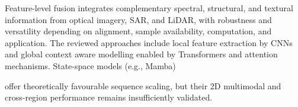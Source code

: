 \documentclass[]{interact}
\theoremstyle{plain}%
\theoremstyle{definition}
\theoremstyle{remark}
\DeclareRobustCommand{\DIFadd}[1]{{\protect\color{DIFaddcolor}\uwave{#1}}}
\DeclareRobustCommand{\DIFdel}[1]{{\protect\color{DIFdelcolor}\sout{#1}}}
\def\DIFadd#1{#1}%
\def\DIFdel#1{}%
\begin{document}
Feature-level fusion\DIFdel{,} \DIFdel{which} \DIFdel{leverages} \DIFdel{sophisticated} \DIFdel{neural} \DIFdel{architectures} \DIFdel{to} \DIFdel{integrate} \DIFdel{the} \DIFadd{integrates} complementary spectral, structural, and textural information from optical imagery, SAR, and LiDAR, \DIFdel{has} \DIFdel{established} \DIFdel{itself} \DIFdel{as} \DIFdel{the} \DIFdel{most} \DIFdel{robust} \DIFadd{with} \DIFadd{robustness} and \DIFdel{versatile} \DIFdel{strategy} \DIFadd{versatility} \DIFadd{depending} \DIFadd{on} \DIFadd{alignment}\DIFadd{,} \DIFadd{sample} \DIFadd{availability}\DIFadd{,} \DIFadd{computation}\DIFadd{,} \DIFadd{and} \DIFadd{application}. \DIFdel{We} \DIFdel{observed} \DIFdel{a} \DIFdel{clear} \DIFdel{evolutionary} \DIFdel{trajectory}\DIFdel{:} \DIFdel{the} \DIFdel{field} \DIFdel{is} \DIFdel{rapidly} \DIFdel{moving} \DIFdel{from} \DIFdel{the} \DIFadd{The} \DIFadd{reviewed} \DIFadd{approaches} \DIFadd{include} local feature \DIFdel{centric} \DIFdel{approach} \DIFdel{of} \DIFdel{CNN} \DIFdel{to} \DIFadd{extraction} \DIFadd{by} \DIFadd{CNNs} \DIFadd{and} global context aware \DIFdel{modeling} \DIFadd{modelling} enabled by \DIFdel{Transformer} \DIFadd{Transformers} and attention mechanisms. \DIFdel{Furthermore}\DIFdel{,} \DIFdel{the} \DIFdel{emergence} \DIFdel{of} \DIFdel{State} \DIFdel{Space} \DIFdel{Models} \DIFadd{State-space} \DIFadd{models} (e.g., Mamba) \DIFdel{hints} \DIFdel{at} \DIFdel{a} \DIFdel{future} \DIFdel{shift} \DIFdel{toward} \DIFdel{architectures} \DIFdel{that} \DIFdel{balance} \DIFdel{high-order} \DIFdel{spatial} \DIFdel{modeling} \DIFdel{with} \DIFdel{linear} \DIFdel{computational} \DIFdel{efficiency}\DIFdel{.}

\DIFdel{However} \DIFadd{offer} \DIFadd{theoretically} \DIFadd{favourable} \DIFadd{sequence} \DIFadd{scaling}, \DIFdel{the} \DIFdel{transition} \DIFdel{to} \DIFdel{`}\DIFdel{`}\DIFdel{Deep} \DIFdel{Fusion''} \DIFdel{is} \DIFdel{not} \DIFdel{without} \DIFdel{critical} \DIFdel{bottlenecks} \DIFadd{but} \DIFadd{their} \DIFadd{2D} \DIFadd{multimodal} \DIFadd{and} \DIFadd{cross-region} \DIFadd{performance} \DIFadd{remains} \DIFadd{insufficiently} \DIFadd{validated}.
\end{document}
